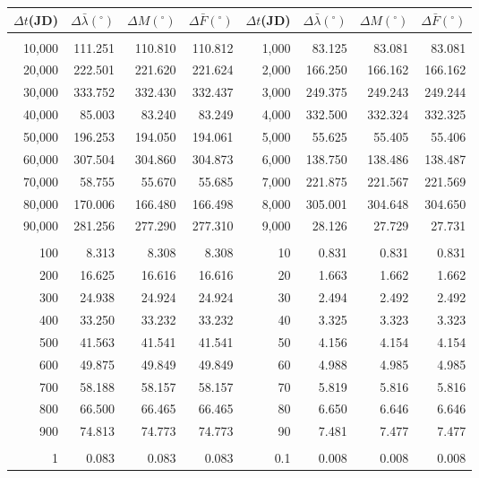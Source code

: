 \newpage
\begin{table}
\centering
\begin{tabular}{rrrr|rrrr}
$\Delta t$(JD)& $\Delta\bar{\lambda}(^\circ)$ &  $\Delta M(^\circ)$ & $\Delta \bar{F}(^\circ)$& $\Delta t$(JD) & $\Delta\bar{\lambda}(^\circ)$ & $\Delta M(^\circ)$ 
&$\Delta \bar{F}(^\circ)$\\ \hline
&&&&&&&\\[-1.75ex]
10,000 & 111.251 & 110.810 & 110.812 & 1,000 &  83.125 &  83.081 &  83.081\\
20,000 & 222.501 & 221.620 & 221.624 & 2,000 & 166.250 & 166.162 & 166.162\\
30,000 & 333.752 & 332.430 & 332.437 & 3,000 & 249.375 & 249.243 & 249.244\\
40,000 &  85.003 &  83.240 &  83.249 & 4,000 & 332.500 & 332.324 & 332.325\\
50,000 & 196.253 & 194.050 & 194.061 & 5,000 &  55.625 &  55.405 &  55.406\\
60,000 & 307.504 & 304.860 & 304.873 & 6,000 & 138.750 & 138.486 & 138.487\\
70,000 &  58.755 &  55.670 &  55.685 & 7,000 & 221.875 & 221.567 & 221.569\\
80,000 & 170.006 & 166.480 & 166.498 & 8,000 & 305.001 & 304.648 & 304.650\\
90,000 & 281.256 & 277.290 & 277.310 & 9,000 &  28.126 &  27.729 &  27.731\\
&&&&&&&\\
100 &   8.313 &   8.308 &   8.308 & 10 &   0.831 &   0.831 &   0.831\\
200 &  16.625 &  16.616 &  16.616 & 20 &   1.663 &   1.662 &   1.662\\
300 &  24.938 &  24.924 &  24.924 & 30 &   2.494 &   2.492 &   2.492\\
400 &  33.250 &  33.232 &  33.232 & 40 &   3.325 &   3.323 &   3.323\\
500 &  41.563 &  41.541 &  41.541 & 50 &   4.156 &   4.154 &   4.154\\
600 &  49.875 &  49.849 &  49.849 & 60 &   4.988 &   4.985 &   4.985\\
700 &  58.188 &  58.157 &  58.157 & 70 &   5.819 &   5.816 &   5.816\\
800 &  66.500 &  66.465 &  66.465 & 80 &   6.650 &   6.646 &   6.646\\
900 &  74.813 &  74.773 &  74.773 & 90 &   7.481 &   7.477 &   7.477\\
&&&&&&&\\
1 &   0.083 &   0.083 &   0.083 & 0.1 &   0.008 &   0.008 &   0.008\\

\end{tabular}
\end{table}
